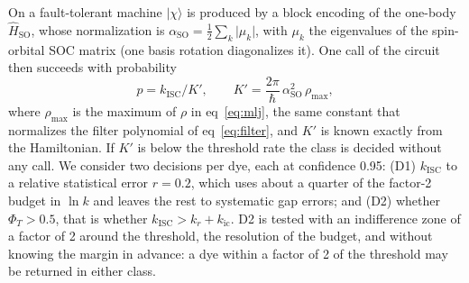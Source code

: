 \documentclass[journal=jctcce,manuscript=article]{achemso}
\newcommand{\kisc}{k_\mathrm{ISC}}
\newcommand{\Hso}{\hat H_\mathrm{SO}}
\newcommand{\aso}{\alpha_\mathrm{SO}}
\begin{document}
On a fault-tolerant machine $\lvert\chi\rangle$ is produced by a block encoding of the one-body
$\Hso$, whose normalization is $\aso=\tfrac12\sum_k\lvert\mu_k\rvert$, with $\mu_k$ the eigenvalues of
the spin-orbital SOC matrix (one basis rotation diagonalizes it). One call of the circuit then succeeds
with probability
\begin{equation}
  p = \kisc/K',\qquad K' = \frac{2\pi}{\hbar}\,\aso^2\,\rho_\mathrm{max},
  \label{eq:p}
\end{equation}
where $\rho_\mathrm{max}$ is the maximum of $\rho$ in eq~\ref{eq:mlj}, the same constant that normalizes
the filter polynomial of eq~\ref{eq:filter}, and $K'$ is known exactly from the Hamiltonian. If $K'$ is below the threshold rate the class is decided
without any call. We consider two decisions per dye, each at confidence 0.95: (D1) $\kisc$ to a relative
statistical error $r=0.2$, which uses about a quarter of the factor-2 budget in $\ln k$ and leaves the
rest to systematic gap errors; and (D2) whether $\Phi_T>0.5$, that is whether $\kisc>k_r+k_\mathrm{ic}$. D2 is
tested with an indifference zone of a factor of 2 around the threshold, the resolution of the budget, and without
knowing the margin in advance: a dye within a factor of 2 of the threshold may be returned in either class.
\end{document}
